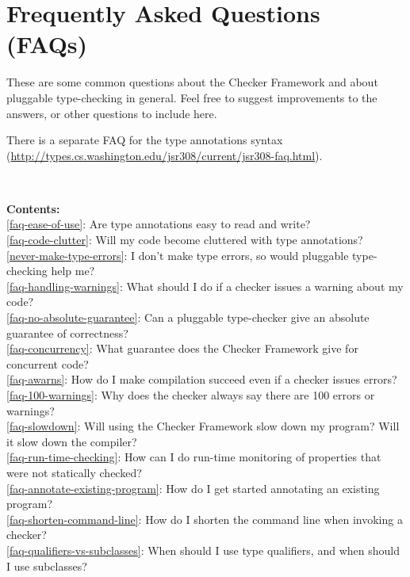 \htmlhr
\chapter{Frequently Asked Questions (FAQs)\label{faq}}

These are some common questions about the Checker Framework and about
pluggable type-checking in general.  Feel free to suggest improvements to
the answers, or other questions to include here.

There is a separate FAQ for the type annotations syntax
(\url{http://types.cs.washington.edu/jsr308/current/jsr308-faq.html}).


~

\noindent
\textbf{Contents:} \\
\ref{faq-ease-of-use}: Are type annotations easy to read and write? \\
\ref{faq-code-clutter}: Will my code become cluttered with type annotations? \\
\ref{never-make-type-errors}: I don't make type errors, so would pluggable type-checking help me? \\
\ref{faq-handling-warnings}: What should I do if a checker issues a warning about my code? \\
\ref{faq-no-absolute-guarantee}: Can a pluggable type-checker give an absolute guarantee of correctness? \\
\ref{faq-concurrency}: What guarantee does the Checker Framework give for concurrent code? \\
\ref{faq-awarns}: How do I make compilation succeed even if a checker issues errors? \\
\ref{faq-100-warnings}: Why does the checker always say there are 100 errors or warnings? \\
\ref{faq-slowdown}: Will using the Checker Framework slow down my program?  Will it slow down the compiler? \\
\ref{faq-run-time-checking}: How can I do run-time monitoring of properties that were not statically checked? \\
\ref{faq-annotate-existing-program}: How do I get started annotating an existing program? \\
\ref{faq-shorten-command-line}: How do I shorten the command line when invoking a checker? \\
\ref{faq-qualifiers-vs-subclasses}: When should I use type qualifiers, and when should I use subclasses? \\
